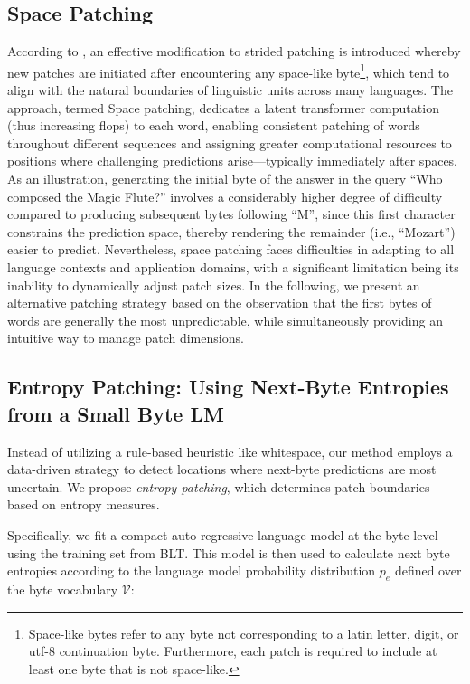 \subsection{Space Patching}
\label{section:white-patch}

According to \citet{slagle2024spacebyte}, an effective modification to strided patching is introduced whereby new patches are initiated after encountering any space-like byte\footnote{
    Space-like bytes refer to any byte not corresponding to a latin letter, digit, or utf-8 continuation byte. Furthermore, each patch is required to include at least one byte that is not space-like.}, which tend to align with the natural boundaries of linguistic units across many languages. The approach, termed Space patching, dedicates a latent transformer computation (thus increasing flops) to each word, enabling consistent patching of words throughout different sequences and assigning greater computational resources to positions where challenging predictions arise—typically immediately after spaces. As an illustration, generating the initial byte of the answer in the query ``Who composed the Magic Flute?\uline{\hspace{.6em}}'' involves a considerably higher degree of difficulty compared to producing subsequent bytes following ``M'', since this first character constrains the prediction space, thereby rendering the remainder (i.e., ``Mozart'') easier to predict. Nevertheless, space patching faces difficulties in adapting to all language contexts and application domains, with a significant limitation being its inability to dynamically adjust patch sizes. In the following, we present an alternative patching strategy based on the observation that the first bytes of words are generally the most unpredictable, while simultaneously providing an intuitive way to manage patch dimensions.

\subsection{Entropy Patching: Using Next-Byte Entropies from a Small Byte LM}
\label{section:dyn-patch}

Instead of utilizing a rule-based heuristic like whitespace, our method employs a data-driven strategy to detect locations where next-byte predictions are most uncertain. We propose \textit{entropy patching}, which determines patch boundaries based on entropy measures.

Specifically, we fit a compact auto-regressive language model at the byte level using the training set from {\textsc BLT}. This model is then used to calculate next byte entropies according to the language model probability distribution $p_{e}$ defined over the byte vocabulary $\mathcal{V}$:

